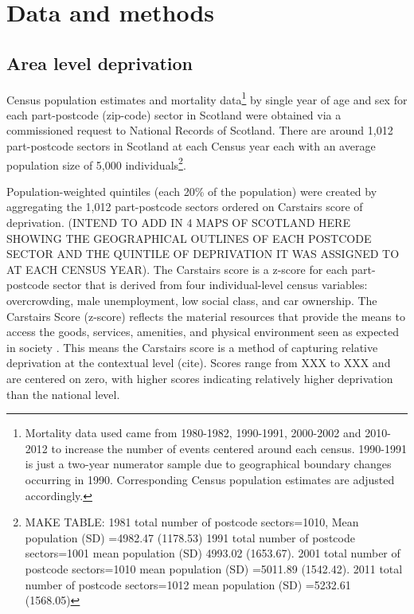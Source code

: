 \documentclass[12pt,oneside,a4paper]{article} %
\theoremstyle{definition}
\begin{document}
\section{Data and methods}

\subsection{Area level deprivation}
Census population estimates and mortality data\footnote{Mortality data used
came from 1980-1982, 1990-1991, 2000-2002 and 2010-2012 to increase the
number of events centered around each census. 1990-1991 is just a two-year
numerator sample due to geographical boundary changes occurring in 1990.
Corresponding Census population estimates are adjusted accordingly.} by single
year of age and sex for each part-postcode (zip-code) sector in Scotland were
obtained via a commissioned request to National Records of Scotland. There are
around 1,012 part-postcode sectors in Scotland at each Census year each with an
average population size of 5,000 individuals\footnote{MAKE TABLE: 1981 total
number of postcode sectors=1010, Mean population (SD) =4982.47 (1178.53) 1991 total number of postcode sectors=1001 mean population (SD) 4993.02 (1653.67). 2001 total number of postcode sectors=1010 mean population (SD) =5011.89 (1542.42). 2011 total number of postcode sectors=1012 mean population (SD) =5232.61 (1568.05)}.
 
Population-weighted quintiles (each 20\% of the population) were created by
aggregating the 1,012 part-postcode sectors ordered on Carstairs score of
deprivation. (INTEND TO ADD IN 4 MAPS OF SCOTLAND HERE SHOWING THE GEOGRAPHICAL OUTLINES OF EACH POSTCODE SECTOR AND THE QUINTILE OF DEPRIVATION IT WAS ASSIGNED TO AT EACH CENSUS YEAR). The Carstairs score is a z-score for each part-postcode sector
that is derived from four individual-level census variables: overcrowding, male
unemployment, low social class, and car ownership. The Carstairs Score
(z-score) reflects the material resources that provide the means to access the
goods, services, amenities, and physical environment seen as expected
in society \citep{Carstairs1989}. This means the Carstairs score is a method of
capturing relative deprivation at the contextual level (cite). Scores range from
XXX to XXX and are centered on zero, with higher scores indicating relatively
higher deprivation than the national level.
\end{document}
